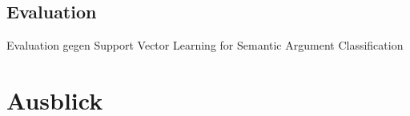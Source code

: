 \documentclass[runningheads]{llncs}
\begin{document}
\subsection{Evaluation}
Evaluation gegen Support Vector Learning for Semantic Argument Classiﬁcation

\section{Ausblick}

	
\end{document}
